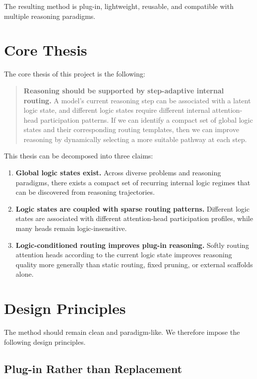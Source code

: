 \documentclass[11pt]{article}
\begin{document}
The resulting method is plug-in, lightweight, reusable, and compatible with multiple reasoning paradigms.

\section{Core Thesis}

The core thesis of this project is the following:

\begin{quote}
\textbf{Reasoning should be supported by step-adaptive internal routing.} A model's current reasoning step can be associated with a latent logic state, and different logic states require different internal attention-head participation patterns. If we can identify a compact set of global logic states and their corresponding routing templates, then we can improve reasoning by dynamically selecting a more suitable pathway at each step.
\end{quote}

This thesis can be decomposed into three claims:

\begin{enumerate}[leftmargin=1.5em]
    \item \textbf{Global logic states exist.} Across diverse problems and reasoning paradigms, there exists a compact set of recurring internal logic regimes that can be discovered from reasoning trajectories.
    \item \textbf{Logic states are coupled with sparse routing patterns.} Different logic states are associated with different attention-head participation profiles, while many heads remain logic-insensitive.
    \item \textbf{Logic-conditioned routing improves plug-in reasoning.} Softly routing attention heads according to the current logic state improves reasoning quality more generally than static routing, fixed pruning, or external scaffolds alone.
\end{enumerate}

\section{Design Principles}

The method should remain clean and paradigm-like. We therefore impose the following design principles.

\subsection{Plug-in Rather than Replacement}
\end{document}
